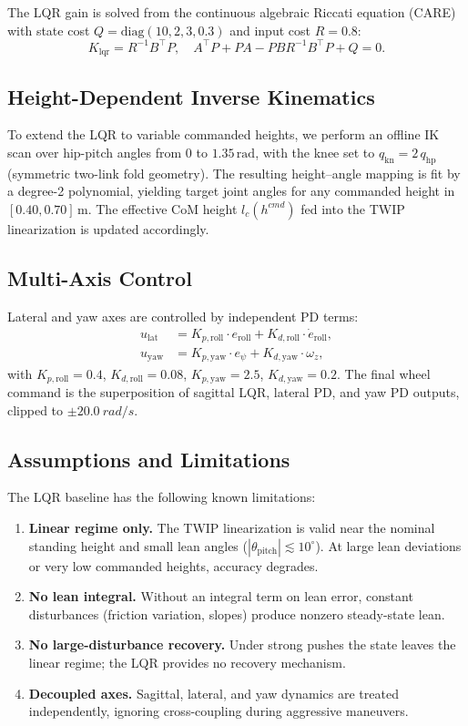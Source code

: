 \documentclass[conference]{IEEEtran}
\begin{document}
The LQR gain is solved from the continuous algebraic Riccati equation
(CARE) with state cost $Q = \mathrm{diag}(10, 2, 3, 0.3)$
and input cost $R = 0.8$:
\begin{equation}
K_{\mathrm{lqr}} = R^{-1} B^\top P,
\quad
A^\top P + P A - P B R^{-1} B^\top P + Q = 0.
\end{equation}

\subsection{Height-Dependent Inverse Kinematics}
To extend the LQR to variable commanded heights, we perform an offline IK
scan over hip-pitch angles from $0$ to $1.35\,\mathrm{rad}$, with the
knee set to $q_{\mathrm{kn}} = 2\,q_{\mathrm{hp}}$ (symmetric two-link
fold geometry).
The resulting height--angle mapping is fit by a degree-2 polynomial,
yielding target joint angles for any commanded height in $[0.40, 0.70]\,\mathrm{m}$.
The effective CoM height $l_c(h^{cmd})$ fed into the TWIP linearization
is updated accordingly.

\subsection{Multi-Axis Control}
Lateral and yaw axes are controlled by independent PD terms:
\begin{align}
u_{\mathrm{lat}} &=
K_{p,\mathrm{roll}} \cdot e_{\mathrm{roll}}
+ K_{d,\mathrm{roll}} \cdot \dot{e}_{\mathrm{roll}}, \\
u_{\mathrm{yaw}} &=
K_{p,\mathrm{yaw}} \cdot e_{\psi}
+ K_{d,\mathrm{yaw}} \cdot \omega_z,
\end{align}
with $K_{p,\mathrm{roll}} = 0.4$, $K_{d,\mathrm{roll}} = 0.08$,
$K_{p,\mathrm{yaw}} = 2.5$, $K_{d,\mathrm{yaw}} = 0.2$.
The final wheel command is the superposition of sagittal LQR,
lateral PD, and yaw PD outputs, clipped to $\pm\SI{20.0}{rad/s}$.

\subsection{Assumptions and Limitations}
The LQR baseline has the following known limitations:
\begin{enumerate}
    \item \textbf{Linear regime only.}
    The TWIP linearization is valid near the nominal standing height
    and small lean angles ($|\theta_{\mathrm{pitch}}| \lesssim 10^\circ$).
    At large lean deviations or very low commanded heights, accuracy degrades.
    \item \textbf{No lean integral.}
    Without an integral term on lean error, constant disturbances
    (friction variation, slopes) produce nonzero steady-state lean.
    \item \textbf{No large-disturbance recovery.}
    Under strong pushes the state leaves the linear regime;
    the LQR provides no recovery mechanism.
    \item \textbf{Decoupled axes.}
    Sagittal, lateral, and yaw dynamics are treated independently,
    ignoring cross-coupling during aggressive maneuvers.
\end{enumerate}
\end{document}
